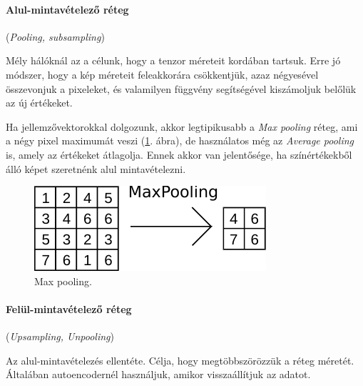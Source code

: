 \paragraph{Alul-mintavételező réteg} (\textit{Pooling, subsampling})



Mély hálóknál az a célunk, hogy a tenzor méreteit kordában tartsuk. Erre jó módszer, hogy a kép méreteit feleakkorára csökkentjük, azaz négyesével összevonjuk a pixeleket, és valamilyen függvény segítségével kiszámoljuk belőlük az új értékeket.



Ha jellemzővektorokkal dolgozunk, akkor legtipikusabb a \textit{Max pooling} réteg, ami a négy pixel maximumát veszi (\ref{fig:maxpooling-pelda}. ábra), de használatos még az \textit{Average pooling} is, amely az értékeket átlagolja. Ennek akkor van jelentősége, ha színértékekből álló képet szeretnénk alul mintavételezni.


\begin{figure} [h!]
	\centering
	\includegraphics[scale=1.2]{img/max-pooling-pelda.pdf}
	\caption{Max pooling.}
	\label{fig:maxpooling-pelda}
\end{figure}


\paragraph{Felül-mintavételező réteg} (\textit{Upsampling, Unpooling})


Az alul-mintavételezés ellentéte. Célja, hogy megtöbbszörözzük a réteg méretét. Általában autoencodernél használjuk, amikor visszaállítjuk az adatot.



